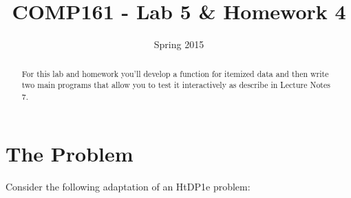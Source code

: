 \documentclass[]{tufte-handout}
\title{COMP161 - Lab 5 \& Homework 4}
\author{}
\date{Spring 2015}
\begin{document}
\maketitle

\begin{abstract}
For this lab and homework you'll develop a function for itemized data and then write two main programs that allow you to test it interactively as describe in Lecture Notes 7.
\end{abstract}

\section{The Problem}

Consider the following adaptation of an HtDP1e problem:
\end{document}
